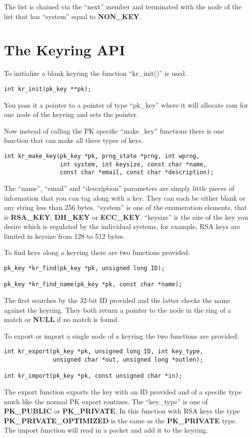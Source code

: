 \documentclass{book}
\begin{document}
The list is chained via the ``next'' member and terminated with the node of the list that has ``system'' equal to 
{\bf NON\_KEY}.

\section{The Keyring API}
To initialize a blank keyring the function ``kr\_init()'' is used.
\begin{verbatim}
int kr_init(pk_key **pk);
\end{verbatim}
You pass it a pointer to a pointer of type ``pk\_key'' where it will allocate ram for one node of the keyring and sets the
pointer.

Now instead of calling the PK specific ``make\_key'' functions there is one function that can make all three types of keys.
\begin{verbatim}
int kr_make_key(pk_key *pk, prng_state *prng, int wprng, 
                int system, int keysize, const char *name,
                const char *email, const char *description);
\end{verbatim}
The ``name'', ``email'' and ``description'' parameters are simply little pieces of information that you can tag along with a
key.  They can each be either blank or any string less than 256 bytes.  ``system'' is one of the enumeration elements, that
is {\bf RSA\_KEY}, {\bf DH\_KEY} or {\bf ECC\_KEY}.  ``keysize'' is the size of the key you desire which is regulated by
the individual systems, for example, RSA keys are limited in keysize from 128 to 512 bytes.

To find keys along a keyring there are two functions provided:
\begin{verbatim}
pk_key *kr_find(pk_key *pk, unsigned long ID);

pk_key *kr_find_name(pk_key *pk, const char *name);
\end{verbatim}
The first searches by the 32-bit ID provided and the latter checks the name against the keyring.  They both return a pointer
to the node in the ring of a match or {\bf NULL} if no match is found.

To export or import a single node of a keyring the two functions are provided:
\begin{verbatim}
int kr_export(pk_key *pk, unsigned long ID, int key_type, 
              unsigned char *out, unsigned long *outlen);

int kr_import(pk_key *pk, const unsigned char *in);
\end{verbatim}
The export function exports the key with an ID provided and of a specific type much like the normal PK export routines.  The
``key\_type'' is one of {\bf PK\_PUBLIC} or {\bf PK\_PRIVATE}.  In this function with RSA keys the type 
{\bf PK\_PRIVATE\_OPTIMIZED} is the same as the {\bf PK\_PRIVATE} type.  The import function will read in a packet and 
add it to the keyring.  
\end{document}
